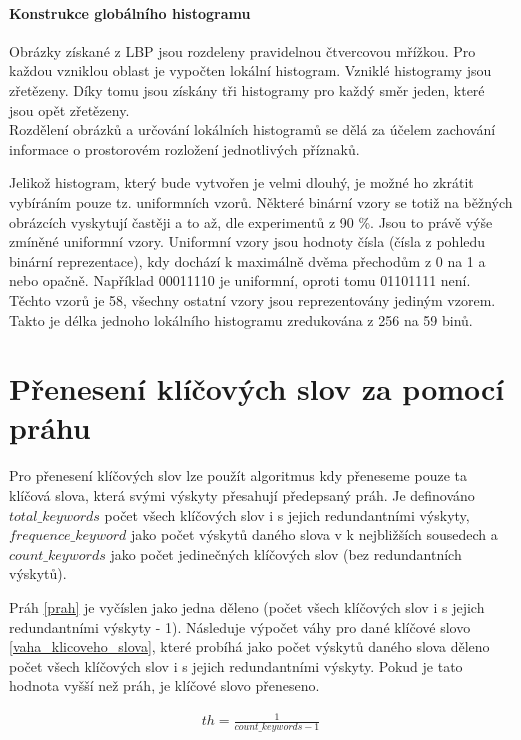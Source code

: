 \documentclass[czech,BP]{thesiskiv}
\begin{document}
\subsubsection{Konstrukce globálního histogramu}
Obrázky získané z LBP jsou rozdeleny pravidelnou čtvercovou mřížkou. Pro každou vzniklou oblast je vypočten lokální histogram. Vzniklé histogramy jsou zřetězeny. Díky tomu jsou získány tři histogramy pro každý směr jeden, které jsou opět zřetězeny. \\
Rozdělení obrázků a určování lokálních histogramů se dělá za účelem zachování informace o prostorovém rozložení jednotlivých příznaků.

Jelikož histogram, který bude vytvořen je velmi dlouhý, je možné ho zkrátit vybíráním pouze tz. uniformních vzorů. Některé binární vzory se totiž na běžných obrázcích vyskytují častěji a to až, dle experimentů z 90 \%. Jsou to právě výše zmíněné uniformní vzory. Uniformní vzory jsou hodnoty čísla (čísla z pohledu binární reprezentace), kdy dochází k maximálně dvěma přechodům z 0 na 1 a nebo opačně. Například 00011110 je uniformní, oproti tomu 01101111 není. Těchto vzorů je 58, všechny ostatní vzory jsou reprezentovány jediným vzorem. Takto je délka jednoho lokálního histogramu zredukována z 256 na 59 binů.
 

 
\chapter{Přenesení klíčových slov za pomocí práhu}
\par Pro přenesení klíčových slov lze použít algoritmus kdy přeneseme pouze ta klíčová slova, která svými výskyty přesahují předepsaný práh. Je definováno $total\_keywords$ počet všech klíčových slov i s jejich redundantními výskyty, $frequence\_keyword$ jako počet výskytů daného slova v k nejbližších sousedech a $count\_keywords$ jako počet jedinečných klíčových slov (bez redundantních výskytů).  

\par Práh \eqref{prah} je vyčíslen jako jedna děleno (počet všech klíčových slov i s jejich redundantními výskyty - 1). Následuje výpočet váhy pro dané klíčové slovo \eqref{vaha_klicoveho_slova}, které probíhá jako počet výskytů daného slova děleno počet všech klíčových slov i s jejich redundantními výskyty. Pokud je tato hodnota vyšší než práh, je klíčové slovo přeneseno.

\begin{align}
   \label{prah} th = \frac{1}{count\_keywords-1}
\end{align}
\end{document}
